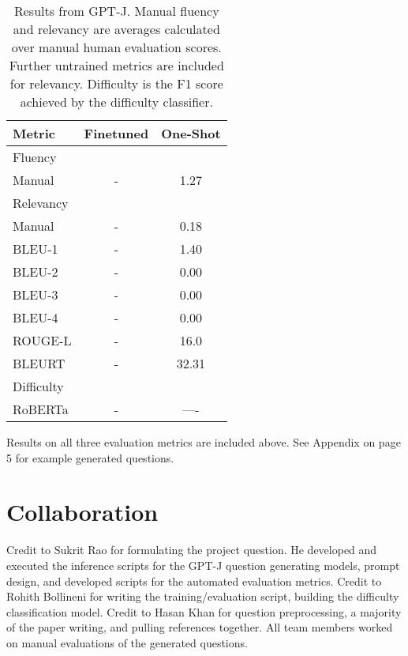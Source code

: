 \documentclass[11pt]{article}
\begin{document}
\begin{table}[h]
\centering
\begin{tabular}{lcc}
\hline
\textbf{Metric} & \textbf{Finetuned} & \textbf{One-Shot}\\
\hline
Fluency & & \\ 
\hspace{0.5cm} Manual & - & 1.27 \\
Relevancy & & \\
\hspace{0.5cm} Manual & - & 0.18 \\
\hspace{0.5cm} BLEU-1 & - & 1.40 \\
\hspace{0.5cm} BLEU-2 & - & 0.00 \\
\hspace{0.5cm} BLEU-3 & - & 0.00 \\
\hspace{0.5cm} BLEU-4 & - & 0.00 \\
\hspace{0.5cm} ROUGE-L & - & 16.0 \\
\hspace{0.5cm} BLEURT & - & 32.31 \\
Difficulty & & \\
\hspace{0.5cm} RoBERTa & - & ---- \\
\hline
\end{tabular}
\caption{\label{citation-guide}
Results from GPT-J. Manual fluency and relevancy are averages calculated over manual human evaluation scores. Further untrained metrics are included for relevancy. Difficulty is the F1 score achieved by the difficulty classifier.  
}
\end{table}

Results on all three evaluation metrics are included above. See Appendix on page 5 for example generated questions. 

\section{Collaboration}
Credit to Sukrit Rao for formulating the project question. He developed and executed the inference scripts for the GPT-J question generating models, prompt design, and developed scripts for the automated evaluation metrics.
Credit to Rohith Bollineni for writing the training/evaluation script, building the difficulty classification model.
Credit to Hasan Khan for question preprocessing, a majority of the paper writing, and pulling references together. All team members worked on manual evaluations of the generated questions. 
\end{document}
